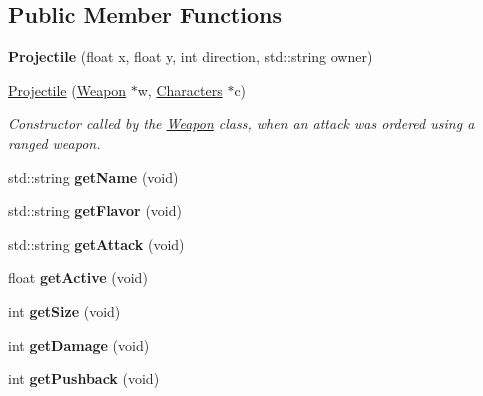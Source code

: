 \subsection*{Public Member Functions}
\begin{DoxyCompactItemize}
\item 
\hypertarget{class_projectile_aa77304b2b631673899c673ea5ff660bd}{{\bfseries Projectile} (float x, float y, int direction, std\+::string owner)}\label{class_projectile_aa77304b2b631673899c673ea5ff660bd}

\item 
\hyperlink{class_projectile_a2131209b192886d9be4fcabe3511a1d3}{Projectile} (\hyperlink{class_weapon}{Weapon} $\ast$w, \hyperlink{class_characters}{Characters} $\ast$c)
\begin{DoxyCompactList}\small\item\em Constructor called by the \hyperlink{class_weapon}{Weapon} class, when an attack was ordered using a ranged weapon. \end{DoxyCompactList}\item 
\hypertarget{class_projectile_ace3baa31fb47d65321b3091e55ea0214}{std\+::string {\bfseries get\+Name} (void)}\label{class_projectile_ace3baa31fb47d65321b3091e55ea0214}

\item 
\hypertarget{class_projectile_a259c762588761610eb08f4590409be47}{std\+::string {\bfseries get\+Flavor} (void)}\label{class_projectile_a259c762588761610eb08f4590409be47}

\item 
\hypertarget{class_projectile_a3d296e98b7227371fdfcfd9fef8bf505}{std\+::string {\bfseries get\+Attack} (void)}\label{class_projectile_a3d296e98b7227371fdfcfd9fef8bf505}

\item 
\hypertarget{class_projectile_a2342bda48bea3511d0b97f5cba7b095f}{float {\bfseries get\+Active} (void)}\label{class_projectile_a2342bda48bea3511d0b97f5cba7b095f}

\item 
\hypertarget{class_projectile_a284ae1c52821f8a9bd5972793eb210d8}{int {\bfseries get\+Size} (void)}\label{class_projectile_a284ae1c52821f8a9bd5972793eb210d8}

\item 
\hypertarget{class_projectile_ab86af40b130ac18871e9a4baec80dc85}{int {\bfseries get\+Damage} (void)}\label{class_projectile_ab86af40b130ac18871e9a4baec80dc85}

\item 
\hypertarget{class_projectile_ad54c17a658890109a332e643bb8446f2}{int {\bfseries get\+Pushback} (void)}\label{class_projectile_ad54c17a658890109a332e643bb8446f2}


\end{DoxyCompactItemize}
